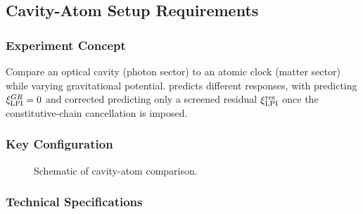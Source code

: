 \subsection{Cavity-Atom Setup Requirements}\label{app:cavity_atom}

\subsubsection{Experiment Concept}

Compare an optical cavity (photon sector) to an atomic clock (matter sector) 
while varying gravitational potential. \DFD predicts different responses, 
with \GR predicting $\xi_{\rm LPI}^{GR}=0$ and corrected \DFD predicting only a screened residual $\xi_{\rm LPI}^{\rm res}$ once the constitutive-chain cancellation is imposed.

\subsubsection{Key Configuration}

\begin{figure}[h!]
\centering
{}
\caption{Schematic of cavity-atom comparison.}
\end{figure}

\subsubsection{Technical Specifications}

